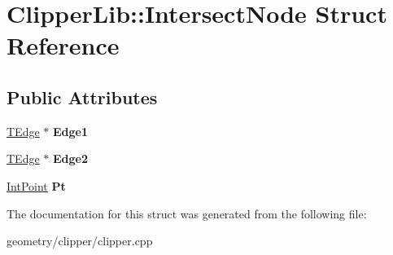 \hypertarget{struct_clipper_lib_1_1_intersect_node}{}\section{Clipper\+Lib\+:\+:Intersect\+Node Struct Reference}
\label{struct_clipper_lib_1_1_intersect_node}
\subsection*{Public Attributes}
\begin{DoxyCompactItemize}
\item 
\mbox{\label{struct_clipper_lib_1_1_intersect_node_a43fd790cc38441edb594841d79b25f13}} 
\mbox{\hyperlink{struct_clipper_lib_1_1_t_edge}{T\+Edge}} $\ast$ {\bfseries Edge1}
\item 
\mbox{\label{struct_clipper_lib_1_1_intersect_node_afcb56e7564fedf1c90962a9f75454539}} 
\mbox{\hyperlink{struct_clipper_lib_1_1_t_edge}{T\+Edge}} $\ast$ {\bfseries Edge2}
\item 
\mbox{\label{struct_clipper_lib_1_1_intersect_node_a91fc92370fb47797dae0602443e6475e}} 
\mbox{\hyperlink{struct_clipper_lib_1_1_int_point}{Int\+Point}} {\bfseries Pt}
\end{DoxyCompactItemize}


The documentation for this struct was generated from the following file\+:\begin{DoxyCompactItemize}
\item 
geometry/clipper/clipper.\+cpp\end{DoxyCompactItemize}
